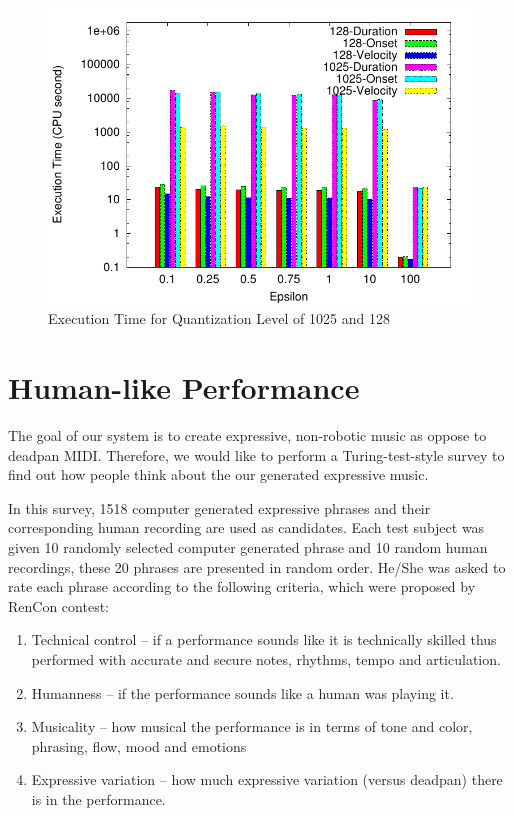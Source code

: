 \begin{figure}[tp]
   \begin{center}
      \includegraphics[width=\textwidth]{fig/quant_comp}
   \end{center}
   \caption{Execution Time for Quantization Level of 1025 and 128}
   \label{fig:quant_comp}
\end{figure}

\section{Human-like Performance}
\label{sec:turing}
The goal of our system is to create expressive, non-robotic music as oppose to deadpan MIDI. Therefore, we would like to perform a Turing-test-style survey to find out how people think about the our generated expressive music.

In this survey, 1518 computer generated expressive phrases and their corresponding human recording are used as candidates. Each test subject was given 10 randomly selected computer generated phrase and 10 random human recordings, these 20 phrases are presented in random order. He/She was asked to rate each phrase according to the following criteria, which were proposed by RenCon contest\cite{rencon}:
\begin{enumerate}
   \item Technical control – if a performance sounds like it is technically skilled thus performed with accurate and secure notes, rhythms, tempo and articulation.
   \item  Humanness – if the performance sounds like a human was playing it.
   \item  Musicality – how musical the performance is in terms of tone and color, phrasing, flow, mood and emotions
   \item Expressive variation – how much expressive variation (versus deadpan) there is in the performance.
\end{enumerate}

